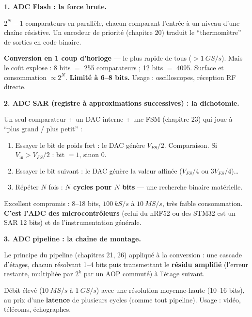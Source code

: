 \documentclass[12pt,a4paper,twoside]{book}
\begin{document}
\begin{formule}
\textbf{1. ADC Flash : la force brute.}

$2^N - 1$ comparateurs en parallèle, chacun comparant l'entrée à un niveau d'une chaîne résistive. Un encodeur de priorité (chapitre 20) traduit le ``thermomètre'' de sorties en code binaire.

\textbf{Conversion en 1 coup d'horloge} --- le plus rapide de tous ($> \SI{1}{GS/s}$). Mais le coût explose : 8 bits $=$ 255 comparateurs ; 12 bits $=$ 4095. Surface et consommation $\propto 2^N$. \textbf{Limité à 6--8 bits.} Usage : oscilloscopes, réception RF directe.
\end{formule}

\begin{formule}
\textbf{2. ADC SAR (registre à approximations successives) : la dichotomie.}

Un seul comparateur + un DAC interne + une FSM (chapitre 23) qui joue à ``plus grand / plus petit'' :
\begin{enumerate}[nosep]
\item Essayer le bit de poids fort : le DAC génère $V_{FS}/2$. Comparaison. Si $V_{\text{in}} > V_{FS}/2$ : bit $= 1$, sinon $0$.
\item Essayer le bit suivant : le DAC génère la valeur affinée ($V_{FS}/4$ ou $3V_{FS}/4$)\ldots
\item Répéter $N$ fois : \textbf{$N$ cycles pour $N$ bits} --- une recherche binaire matérielle.
\end{enumerate}
Excellent compromis : 8--18 bits, $\SI{100}{kS/s}$ à $\SI{10}{MS/s}$, très faible consommation. \textbf{C'est l'ADC des microcontrôleurs} (celui du nRF52 ou des STM32 est un SAR 12 bits) et de l'instrumentation générale.
\end{formule}

\begin{formule}
\textbf{3. ADC pipeline : la chaîne de montage.}

Le principe du pipeline (chapitres 21, 26) appliqué à la conversion : une cascade d'étages, chacun résolvant 1--4 bits puis transmettant le \textbf{résidu amplifié} (l'erreur restante, multipliée par $2^k$ par un AOP commuté) à l'étage suivant.

Débit élevé ($\SI{10}{MS/s}$ à $\SI{1}{GS/s}$) avec une résolution moyenne-haute (10--16 bits), au prix d'une \textbf{latence} de plusieurs cycles (comme tout pipeline). Usage : vidéo, télécoms, échographes.
\end{formule}
\end{document}
